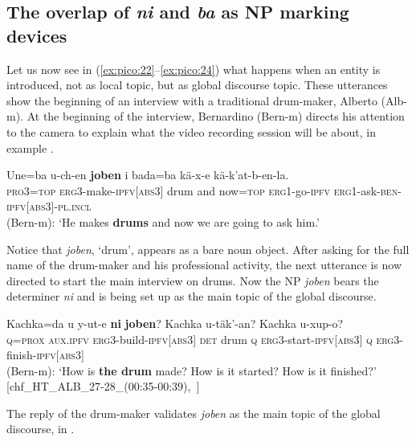 \documentclass[output=paper
,modfonts
,nonflat]{langsci/langscibook}
\begin{document}
\subsection{The overlap of \textit{ni} and \textit{ba} as NP marking devices}\label{sec:pico:3.4}


Let us now see in (\ref{ex:pico:22}--\ref{ex:pico:24}) what happens when an entity is introduced, not as local topic, but as global discourse topic. These utterances show the beginning of an interview with a traditional drum-maker, Alberto (Alb-m). At the beginning of the interview, Bernardino (Bern-m) directs his attention to the camera to explain what the video recording session will be about, in example .

\ea  \label{ex:pico:22}

\gll Une=ba u-ch-en \textbf{joben} i bada=ba k\"a-x-e k\"a-k'at-b-en-la.\\
\textsc{pro3}=\textsc{top} \textsc{erg3}-make-\textsc{ipfv[abs3]} {drum} and {now}=\textsc{top} \textsc{erg1}-go-\textsc{ipfv} \textsc{erg1}-ask-\textsc{ben}-\textsc{ipfv[abs3]}-\textsc{pl.incl}\\
\glt (Bern-m): `He makes \textbf{drums} and now we are going to ask him.'
\z

Notice that \textit{joben}, `drum', appears as a bare noun object. After asking for the full name of the drum-maker and his professional activity, the next utterance  is now directed to start the main interview on drums. Now the NP \textit{joben} bears the determiner \textit{ni} and is being set up as the main topic of the global discourse.


\ea  \label{ex:pico:23}

\gll Kachka=da  u y-ut-e \textbf{ni} \textbf{joben}? Kachka u-täk'-an?  Kachka u-xup-o?\\
\textsc{q=prox} \textsc{aux.ipfv} \textsc{erg3}-build-\textsc{ipfv[abs3]} \textsc{det} {drum} \textsc{q} \textsc{erg3}-start-\textsc{ipfv[abs3]} {\textsc q} \textsc{erg3}-finish-\textsc{ipfv[abs3]}\\
\glt (Bern-m): `How is \textbf{the drum} made? How is it started? How is it finished?' [chf\_HT\_ALB\_27-28\_(00:35-00:39),~\citealt{Delgado-Galvan2018archive}]
\z

The reply of the drum-maker validates \textit{joben} as the main topic of the global discourse, in .
\end{document}
